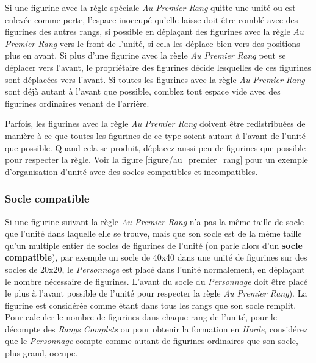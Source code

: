 Si une figurine avec la règle spéciale \emph{Au Premier Rang} quitte une unité ou est enlevée comme perte, l'espace inoccupé qu'elle laisse doit être comblé avec des figurines des autres rangs, si possible en déplaçant des figurines avec la règle \emph{Au Premier Rang} vers le front de l'unité, si cela les déplace bien vers des positions plus en avant. Si plus d'une figurine avec la règle \emph{Au Premier Rang} peut se déplacer vers l'avant, le propriétaire des figurines décide lesquelles de ces figurines sont déplacées vers l'avant. Si toutes les figurines avec la règle \emph{Au Premier Rang} sont déjà autant à l'avant que possible, comblez tout espace vide avec des figurines ordinaires venant de l'arrière.

Parfois, les figurines avec la règle \emph{Au Premier Rang} doivent être redistribuées de manière à ce que toutes les figurines de ce type soient autant à l'avant de l'unité que possible. Quand cela se produit, déplacez aussi peu de figurines que possible pour respecter la règle. Voir la figure \ref{figure/au_premier_rang} pour un exemple d'organisation d'unité avec des socles compatibles et incompatibles.

\subsubsection*{Socle compatible}
Si une figurine suivant la règle \emph{Au Premier Rang} n'a pas la même taille de socle que l'unité dans laquelle elle se trouve, mais que son socle est de la même taille qu'un multiple entier de socles de figurines de l'unité (on parle alors d'un \textbf{socle compatible}), par exemple un socle de 40x40{\milli\meter} dans une unité de figurines sur des socles de 20x20{\milli\meter}, le \emph{Personnage} est placé dans l'unité normalement, en déplaçant le nombre nécessaire de figurines. L'avant du socle du \emph{Personnage} doit être placé le plus à l'avant possible de l'unité pour respecter la règle \emph{Au Premier Rang}). La figurine est considérée comme étant dans tous les rangs que son socle remplit. Pour calculer le nombre de figurines dans chaque rang de l'unité, pour le décompte des \emph{Rangs Complets} ou pour obtenir la formation en \emph{Horde}, considérez que le \emph{Personnage} compte comme autant de figurines ordinaires que son socle, plus grand, occupe. 

